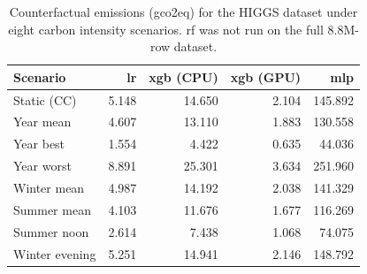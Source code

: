 \begin{table}[htbp]
\centering
\small
\caption[Counterfactual emissions for HIGGS under timing scenarios.]{Counterfactual emissions (\acrshort{gco2eq}) for the HIGGS dataset under eight carbon intensity scenarios. \acrshort{rf} was not run on the full 8.8M-row dataset.}
\label{tab:app_cf_higgs}
\begin{tabular}{@{} l r r r r @{}}
\toprule
\textbf{Scenario} & \textbf{\gls{lr}} & \textbf{\gls{xgb} (CPU)} & \textbf{\gls{xgb} (GPU)} & \textbf{\gls{mlp}} \\
\midrule
Static (CC)    &   5.148 &  14.650 &  2.104 & 145.892 \\
Year mean      &   4.607 &  13.110 &  1.883 & 130.558 \\
Year best      &   1.554 &   4.422 &  0.635 &  44.036 \\
Year worst     &   8.891 &  25.301 &  3.634 & 251.960 \\
Winter mean    &   4.987 &  14.192 &  2.038 & 141.329 \\
Summer mean    &   4.103 &  11.676 &  1.677 & 116.269 \\
Summer noon    &   2.614 &   7.438 &  1.068 &  74.075 \\
Winter evening &   5.251 &  14.941 &  2.146 & 148.792 \\
\bottomrule
\end{tabular}
\end{table}
